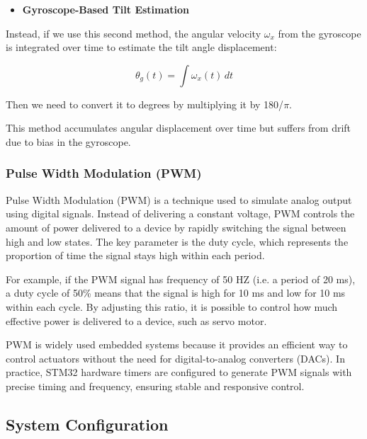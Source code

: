 \bigskip
\begin{itemize}
    \item \textbf{Gyroscope-Based Tilt Estimation}
    
\end{itemize}
\noindent
Instead, if we use this second method, the angular velocity $\omega_x$ from the gyroscope is integrated over time to estimate the tilt angle displacement:

\[\theta_g(t) = \int \omega_x(t) \, dt\]

Then we need to convert it to degrees by multiplying it by 180/$\pi$.

This method accumulates angular displacement over time but suffers from drift due to bias in the gyroscope. 


\subsubsection{Pulse Width Modulation (PWM)}


Pulse Width Modulation (PWM) is a technique used to simulate analog output using digital signals.
Instead of delivering a constant voltage, PWM controls the amount of power delivered to a device by rapidly switching the signal between high and low states. The key parameter is the duty cycle, which represents the proportion of time the signal stays high within each period.

For example, if the PWM signal has frequency of 50 HZ (i.e. a period of 20 ms), a duty cycle of 50\% means that the signal is high for 10 ms and low for 10 ms within each cycle. By adjusting this ratio, it is possible to control how much effective power is delivered to a device, such as servo motor. 

PWM is widely used embedded systems because it provides an efficient way to control actuators without the need for digital-to-analog converters (DACs). In practice, STM32 hardware timers are configured to generate PWM signals with precise timing and frequency, ensuring stable and responsive control.



\subsection{System Configuration}

